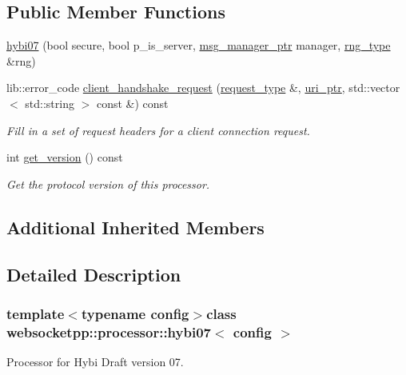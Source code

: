 \subsection*{Public Member Functions}
\begin{DoxyCompactItemize}
\item 
\hyperlink{classwebsocketpp_1_1processor_1_1hybi07_a1e77a4eb4842277d510fd761fea40b0f}{hybi07} (bool secure, bool p\+\_\+is\+\_\+server, \hyperlink{classwebsocketpp_1_1processor_1_1hybi07_abfa0723364d644f3320141ade624fc8e}{msg\+\_\+manager\+\_\+ptr} manager, \hyperlink{classwebsocketpp_1_1processor_1_1hybi07_afb0db8323385a430df83372ce5b29bc2}{rng\+\_\+type} \&rng)
\item 
lib\+::error\+\_\+code \hyperlink{classwebsocketpp_1_1processor_1_1hybi07_a0e292ce9de6a8f3329b8bd62aa89f299}{client\+\_\+handshake\+\_\+request} (\hyperlink{classwebsocketpp_1_1processor_1_1hybi07_ae8e3aeed4b4d6d67c8af5dccf70d468d}{request\+\_\+type} \&, \hyperlink{namespacewebsocketpp_aae370ea5ac83a8ece7712cb39fc23f5b}{uri\+\_\+ptr}, std\+::vector$<$ std\+::string $>$ const \&) const 
\begin{DoxyCompactList}\small\item\em Fill in a set of request headers for a client connection request. \end{DoxyCompactList}\item 
int \hyperlink{classwebsocketpp_1_1processor_1_1hybi07_accf162fd3077e1e9788aef66e3c24859}{get\+\_\+version} () const 
\begin{DoxyCompactList}\small\item\em Get the protocol version of this processor. \end{DoxyCompactList}\end{DoxyCompactItemize}
\subsection*{Additional Inherited Members}


\subsection{Detailed Description}
\subsubsection*{template$<$typename config$>$class websocketpp\+::processor\+::hybi07$<$ config $>$}

Processor for Hybi Draft version 07. 

